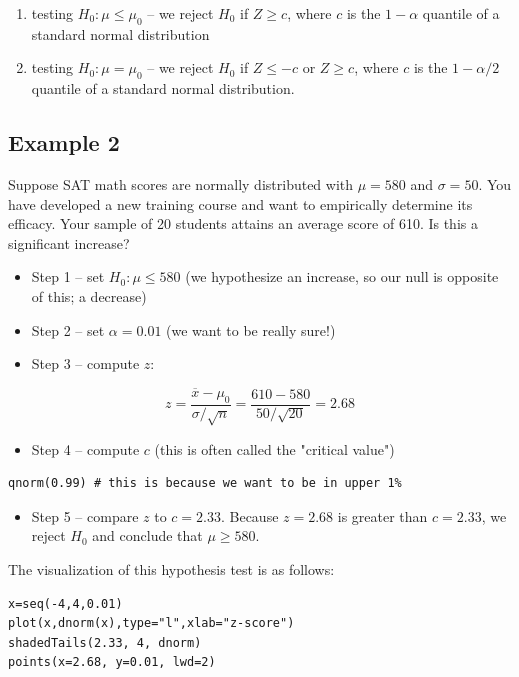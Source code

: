 \documentclass[11pt]{article}
\begin{document}
\begin{enumerate}
\item testing $H_0:\mu \leq \mu_0$ -- we reject $H_0$ if $Z\geq c$, where $c$ is the $1-\alpha$ quantile of a standard normal distribution

\item testing $H_0:\mu = \mu_0$ -- we reject $H_0$ if $Z\leq -c$ or $Z\geq c$, where $c$ is the $1-\alpha/2$ quantile of a standard normal distribution.
\end{enumerate}


\subsection*{Example 2}
\label{sec-1-4}
Suppose SAT math scores are normally distributed with $\mu=580$ and $\sigma=50$.  You have developed a new training course and want to empirically determine its efficacy.  Your sample of 20 students attains an average score of 610.  Is this a significant increase?

\begin{itemize}
\item Step 1 -- set $H_0: \mu \leq 580$ (we hypothesize an increase, so our null is opposite of this; a decrease)
\item Step 2 -- set $\alpha=0.01$ (we want to be really sure!)
\item Step 3 -- compute $z$:
\end{itemize}

\[
z=\frac{\overline{x}-\mu_0}{\sigma / \sqrt{n}} = \frac{610-580}{50 / \sqrt{20}} = 2.68
\]

\begin{itemize}
\item Step 4 -- compute $c$ (this is often called the "critical value")
\end{itemize}

\begin{verbatim}
qnorm(0.99) # this is because we want to be in upper 1%
\end{verbatim}

\begin{itemize}
\item Step 5 -- compare $z$ to $c=2.33$.  Because $z=2.68$ is greater than $c=2.33$, we reject $H_0$ and conclude that $\mu \geq 580$.
\end{itemize}

The visualization of this hypothesis test is as follows:

\begin{verbatim}
x=seq(-4,4,0.01)
plot(x,dnorm(x),type="l",xlab="z-score")
shadedTails(2.33, 4, dnorm)
points(x=2.68, y=0.01, lwd=2)
\end{verbatim}
\end{document}
